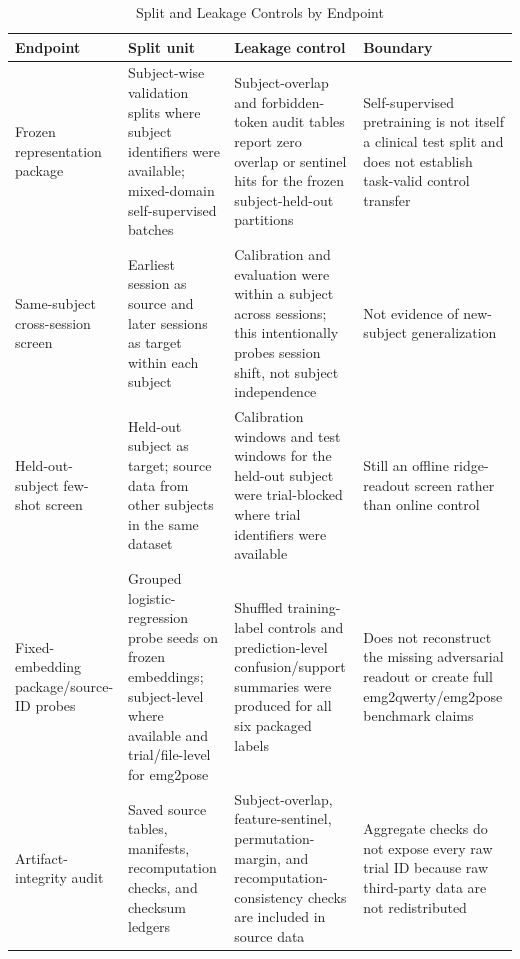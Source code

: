 \documentclass[journal]{IEEEtran}
\begin{document}
\begin{table}[t]
\caption{Split and Leakage Controls by Endpoint}
\label{tab:splitleakage}
\centering
\footnotesize
\begin{tabularx}{\textwidth}{@{}p{3.0cm}p{3.8cm}p{4.2cm}Y@{}}
\toprule
Endpoint & Split unit & Leakage control & Boundary \\
\midrule
Frozen representation package & Subject-wise validation splits where subject identifiers were available; mixed-domain self-supervised batches & Subject-overlap and forbidden-token audit tables report zero overlap or sentinel hits for the frozen subject-held-out partitions & Self-supervised pretraining is not itself a clinical test split and does not establish task-valid control transfer \\
Same-subject cross-session screen & Earliest session as source and later sessions as target within each subject & Calibration and evaluation were within a subject across sessions; this intentionally probes session shift, not subject independence & Not evidence of new-subject generalization \\
Held-out-subject few-shot screen & Held-out subject as target; source data from other subjects in the same dataset & Calibration windows and test windows for the held-out subject were trial-blocked where trial identifiers were available & Still an offline ridge-readout screen rather than online control \\
Fixed-embedding package/source-ID probes & Grouped logistic-regression probe seeds on frozen embeddings; subject-level where available and trial/file-level for emg2pose & Shuffled training-label controls and prediction-level confusion/support summaries were produced for all six packaged labels & Does not reconstruct the missing adversarial readout or create full emg2qwerty/emg2pose benchmark claims \\
Artifact-integrity audit & Saved source tables, manifests, recomputation checks, and checksum ledgers & Subject-overlap, feature-sentinel, permutation-margin, and recomputation-consistency checks are included in source data & Aggregate checks do not expose every raw trial ID because raw third-party data are not redistributed \\
\bottomrule
\end{tabularx}
\end{table}
\end{document}
